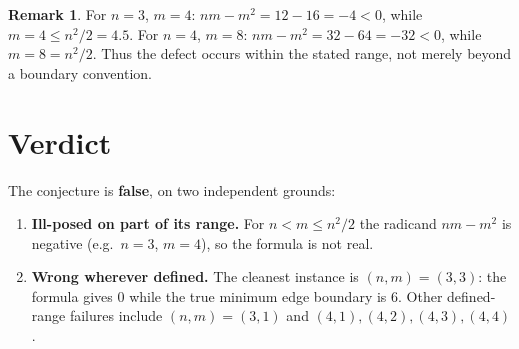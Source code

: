 \documentclass[11pt]{article}
\theoremstyle{definition}
\newtheorem{remark}[theorem]{Remark}
\begin{document}
\begin{remark}
For $n=3$, $m=4$: $nm-m^2=12-16=-4<0$, while $m=4\le n^2/2=4.5$. For $n=4$,
$m=8$: $nm-m^2=32-64=-32<0$, while $m=8=n^2/2$. Thus the defect occurs within
the stated range, not merely beyond a boundary convention.
\end{remark}

\section{Verdict}

The conjecture is \textbf{false}, on two independent grounds:
\begin{enumerate}
  \item \textbf{Ill-posed on part of its range.} For $n<m\le n^2/2$ the
        radicand $nm-m^2$ is negative (e.g.\ $n=3$, $m=4$), so the formula is
        not real.
  \item \textbf{Wrong wherever defined.} The cleanest instance is
        $(n,m)=(3,3)$: the formula gives $0$ while the true minimum edge
        boundary is $6$. Other defined-range failures include $(n,m)=(3,1)$
        and $(4,1),(4,2),(4,3),(4,4)$.
\end{enumerate}
\end{document}

